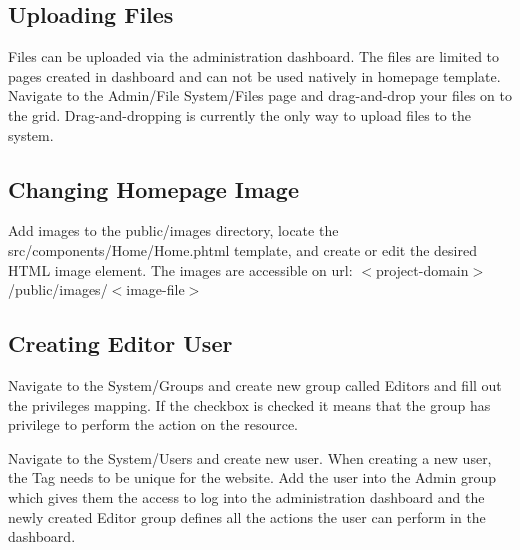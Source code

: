 \subsection*{Uploading Files}
Files can be uploaded via the administration dashboard.
The files are limited to pages created in dashboard and can not be used natively in homepage template.
Navigate to the Admin/File System/Files page and drag-and-drop your files on to the grid.
Drag-and-dropping is currently the only way to upload files to the system.

\subsection*{Changing Homepage Image}
Add images to the public/images directory, locate the src/components/Home/Home.phtml template, and create or edit the
desired HTML image element.
The images are accessible on url: \(<\)project-domain\(>\)/public/images/\(<\)image-file\(>\)

\subsection*{Creating Editor User}
Navigate to the System/Groups and create new group called Editors and fill out the privileges mapping.
If the checkbox is checked it means that the group has privilege to perform the action on the resource.

Navigate to the System/Users and create new user.
When creating a new user, the Tag needs to be unique for the website.
Add the user into the Admin group which gives them the access to log into the administration dashboard
and the newly created Editor group defines all the actions the user can perform in the dashboard.
